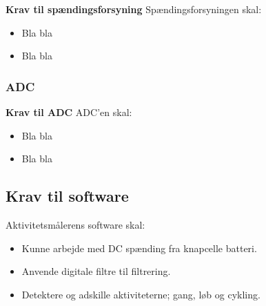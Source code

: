 \textbf{Krav til spændingsforsyning} \newline
Spændingsforsyningen skal:
\begin{itemize}
\item Bla bla
\item Bla bla
\end{itemize}



\subsubsection{ADC}


\textbf{Krav til ADC} \newline
ADC'en skal:
\begin{itemize}
\item Bla bla
\item Bla bla
\end{itemize}








\subsection{Krav til software}
Aktivitetsmålerens software skal:
\begin{itemize}
\item Kunne arbejde med DC spænding fra knapcelle batteri.
\item Anvende digitale filtre til filtrering.
\item Detektere og adskille aktiviteterne; gang, løb og cykling. 
\end{itemize}
 


